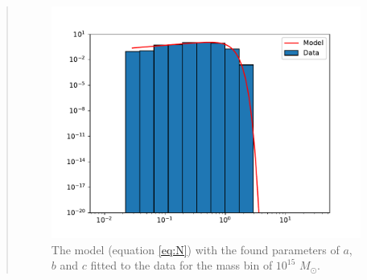 \begin{quote}
\begin{figure}[!ht]
\centering
\includegraphics[scale=0.7]{plots/satgals_m15.pdf}
\caption{The model (equation \ref{eq:N}) with the found parameters of $a$, $b$ and $c$ fitted to the data for the mass bin of $10^{15}$ $M_{\odot}$.}
\end{figure}
\end{quote}



















